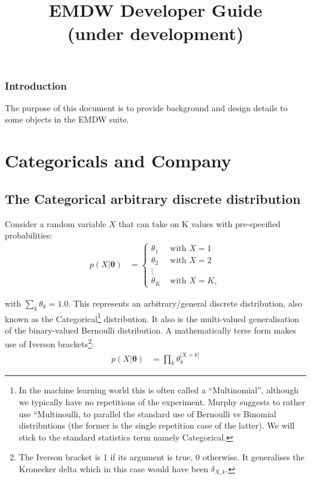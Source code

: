 \documentclass[oneside,english]{scrbook}
\begin{document}
\title{EMDW Developer Guide \\
(under development)}



\maketitle
\tableofcontents{}
\pagebreak

\section*{Introduction}

The purpose of this document is to provide background and design details
to some objects in the EMDW suite.

\part{Categoricals and Company}

\chapter{The Categorical arbitrary discrete distribution} \label{ch:categorical}

Consider a random variable $X$ that can take on K
values with pre-specified probabilities:
\begin{align*}
  p(X|\bm{\theta}) &= \left\{
    \begin{array}{lr}
    \theta_1 & \mbox{ with } X=1\\
    \theta_2 & \mbox{ with } X=2\\
    \vdots &\\
    \theta_K & \mbox{ with } X=K,
\end{array}
\right.
\end{align*}

with $\sum_{k}\theta_k = 1.0$. This represents an arbitrary/general
discrete distribution, also known as the Categorical\footnote{In the
  machine learning world this is often called a ``Multinomial'',
  although we typically have no repetitions of the experiment. Murphy
  \cite{Murphy2012} suggests to rather use ``Multinoulli, to parallel
  the standard use of Bernoulli vs Binomial distributions (the former
  is the single repetition case of the latter). We will stick to the
  standard statistics term namely Categorical.}  distribution. It also
is the multi-valued generalisation of the binary-valued Bernoulli
distribution. A mathematically terse form makes use of Iverson
brackets\footnote{The Iverson bracket is 1 if its argument is true, 0
  otherwise. It generalises the Kronecker delta which in this case
  would have been $\delta_{X,k}$.}:
\begin{align}
p(X|\bm{\theta}) &= \prod_{k} \theta_k^{\mathbb{[}X=k\mathbb{]}} \label{eq:categorical}
\end{align}
\end{document}
